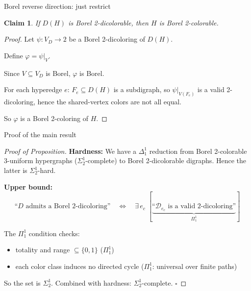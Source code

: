 \documentclass[aspectratio=169, 12pt]{beamer}
\newtheorem{claim}[theorem]{Claim}
\begin{document}
\begin{frame}{Borel reverse direction: just restrict}
\begin{claim}
If $D(H)$ is Borel 2-dicolorable, then $H$ is Borel 2-colorable.
\end{claim}

\pause

\begin{proof}
Let $\psi\colon V_D \to 2$ be a Borel 2-dicoloring of $D(H)$.

\medskip

Define $\varphi = \psi|_V$.

\medskip

Since $V \subseteq V_D$ is Borel, $\varphi$ is Borel.

\medskip

For each hyperedge $e$: $F_e \subseteq D(H)$ is a subdigraph, so $\psi|_{V(F_e)}$ is a valid 2-dicoloring, hence the shared-vertex colors are not all equal.

\medskip

So $\varphi$ is a Borel 2-coloring of $H$.
\end{proof}
\end{frame}

\begin{frame}{Proof of the main result}
\begin{proof}[Proof of Proposition]

\textbf{Hardness:} We have a $\Delta^1_1$ reduction from Borel 2-colorable 3-uniform hypergraphs ($\Sigma^1_2$-complete) to Borel 2-dicolorable digraphs. Hence the latter is $\Sigma^1_2$-hard.

\pause
\bigskip

\textbf{Upper bound:}
$$
\text{``$D$ admits a Borel 2-dicoloring''}
\quad\Longleftrightarrow\quad
\exists\, e_c\; [\underbrace{\text{``$\mathcal{D}_{e_c}$ is a valid 2-dicoloring''}}_{\Pi^1_1}]
$$

The $\Pi^1_1$ condition checks:
\begin{itemize}
	\item totality and range $\subseteq \{0,1\}$ \quad ($\Pi^1_1$)
	\item each color class induces no directed cycle \quad ($\Pi^1_1$: universal over finite paths)
\end{itemize}

\medskip

So the set is $\Sigma^1_2$. Combined with hardness: \alert{$\Sigma^1_2$-complete}. \hfill$\square$
\end{proof}
\end{frame}
\end{document}
